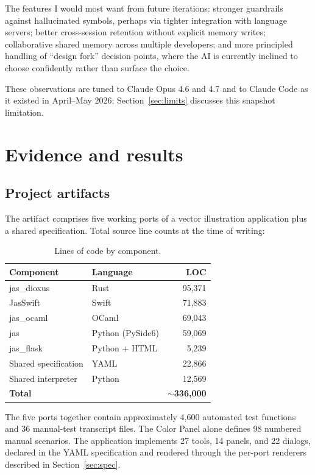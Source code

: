 \documentclass[10pt]{article}
\begin{document}
The features I would most want from future iterations: stronger
guardrails against hallucinated symbols, perhaps via tighter integration
with language servers; better cross-session retention without explicit
memory writes; collaborative shared memory across multiple developers;
and more principled handling of ``design fork'' decision points, where
the AI is currently inclined to choose confidently rather than surface
the choice.

These observations are tuned to Claude Opus 4.6 and 4.7 and to Claude
Code as it existed in April--May 2026; Section~\ref{sec:limits}
discusses this snapshot limitation.

\section{Evidence and results}
\label{sec:evidence}

\subsection{Project artifacts}

The artifact comprises five working ports of a vector illustration
application plus a shared specification. Total source line counts at the
time of writing:

\begin{table}[h]
\centering
\caption{Lines of code by component.}
\begin{tabular}{llr}
\toprule
Component & Language & LOC \\
\midrule
jas\_dioxus & Rust & 95{,}371 \\
JasSwift & Swift & 71{,}883 \\
jas\_ocaml & OCaml & 69{,}043 \\
jas & Python (PySide6) & 59{,}069 \\
jas\_flask & Python + HTML & 5{,}239 \\
Shared specification & YAML & 22{,}866 \\
Shared interpreter & Python & 12{,}569 \\
\midrule
\textbf{Total} & & \textbf{$\sim$336{,}000} \\
\bottomrule
\end{tabular}
\end{table}

The five ports together contain approximately 4{,}600 automated test
functions and 36 manual-test transcript files. The Color Panel alone
defines 98 numbered manual scenarios. The application implements 27
tools, 14 panels, and 22 dialogs, declared in the YAML specification and
rendered through the per-port renderers described in
Section~\ref{sec:spec}.
\end{document}
